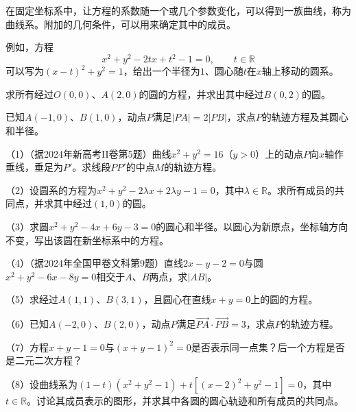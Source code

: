 在固定坐标系中，让方程的系数随一个或几个参数变化，可以得到一族曲线，称为{\heiti{}曲线系}。附加的几何条件，可以用来确定其中的成员。

例如，方程
\begin{equation}\label{eq:quadratic-circle-family}
    x^{2} + y^{2} - 2tx + t^{2} - 1 = 0 , \qquad t \in \mathbb{R}
\end{equation}
可以写为\((x-t)^{2}+y^{2}=1\)，给出一个半径为\(1\)、圆心随\(t\)在\(x\)轴上移动的圆系。

\begin{example}\label{ex:quadratic-circle-family}
求所有经过\(O(0,0)\)、\(A(2,0)\)的圆的方程，并求出其中经过\(B(0,2)\)的圆。
\end{example}

\begin{example}\label{ex:quadratic-distance-ratio}
已知\(A(-1,0)\)、\(B(1,0)\)，动点\(P\)满足\(|PA|=2|PB|\)，求点\(P\)的轨迹方程及其圆心和半径。
\end{example}

\begin{exercise}
\mbox{}

（1）（据2024年新高考II卷第5题）曲线\(x^{2} + y^{2} = 16\)（\(y > 0\)）上的动点\(P\)向\(x\)轴作垂线，垂足为\(P'\)。求线段\(PP'\)的中点\(M\)的轨迹方程。

（2）设圆系的方程为\(x^{2} + y^{2} - 2\lambda x + 2\lambda y - 1 = 0\)，其中\(\lambda \in \mathbb{R}\)。求所有成员的共同点，并求其中经过\((1,0)\)的圆。

（3）求圆\(x^{2}+y^{2}-4x+6y-3=0\)的圆心和半径。以圆心为新原点，坐标轴方向不变，写出该圆在新坐标系中的方程。

（4）（据2024年全国甲卷文科第9题）直线\(2x-y-2=0\)与圆\(x^{2}+y^{2}-6x-8y=0\)相交于\(A\)、\(B\)两点，求\(|AB|\)。

（5）求经过\(A(1,1)\)、\(B(3,1)\)，且圆心在直线\(x+y=0\)上的圆的方程。

（6）已知\(A(-2,0)\)、\(B(2,0)\)，动点\(P\)满足\(\overrightarrow{PA}\cdot\overrightarrow{PB}=3\)，求点\(P\)的轨迹方程。

（7）方程\(x+y-1=0\)与\((x+y-1)^{2}=0\)是否表示同一点集？后一个方程是否是二元二次方程？

（8）设曲线系为\((1-t)(x^{2}+y^{2}-1)+t[(x-2)^{2}+y^{2}-1]=0\)，其中\(t\in\mathbb{R}\)。讨论其成员表示的图形，并求其中各圆的圆心轨迹和所有成员的共同点。
\end{exercise}

